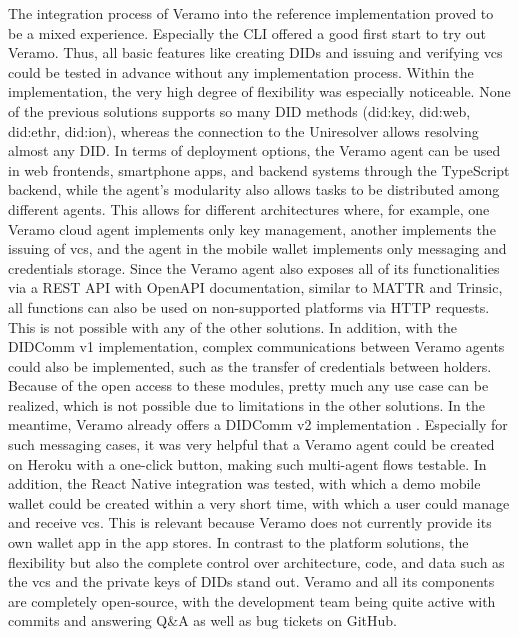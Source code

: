     The integration process of Veramo into the reference implementation proved to be a mixed experience. Especially the CLI offered a good first start to try out Veramo. Thus, all basic features like creating \acp{DID} and issuing and verifying \acp{vc} could be tested in advance without any implementation process. Within the implementation, the very high degree of flexibility was especially noticeable. None of the previous solutions supports so many DID methods (did:key, did:web, did:ethr, did:ion), whereas the connection to the Uniresolver allows resolving almost any DID. In terms of deployment options, the Veramo agent can be used in web frontends, smartphone apps, and backend systems through the TypeScript backend, while the agent's modularity also allows tasks to be distributed among different agents. This allows for different architectures where, for example, one Veramo cloud agent implements only key management, another implements the issuing of \acp{vc}, and the agent in the mobile wallet implements only messaging and credentials storage. Since the Veramo agent also exposes all of its functionalities via a REST API with OpenAPI documentation, similar to MATTR and Trinsic, all functions can also be used on non-supported platforms via HTTP requests. This is not possible with any of the other solutions. In addition, with the DIDComm v1 implementation, complex communications between Veramo agents could also be implemented, such as the transfer of credentials between holders. Because of the open access to these modules, pretty much any use case can be realized, which is not possible due to limitations in the other solutions. In the meantime, Veramo already offers a DIDComm v2 implementation \cite{veramo_blog_2021}. Especially for such messaging cases, it was very helpful that a Veramo agent could be created on Heroku with a one-click button, making such multi-agent flows testable. In addition, the React Native integration was tested, with which a demo mobile wallet could be created within a very short time, with which a user could manage and receive \acp{vc}. This is relevant because Veramo does not currently provide its own wallet app in the app stores. In contrast to the platform solutions, the flexibility but also the complete control over architecture, code, and data such as the \acp{vc} and the private keys of \acp{DID} stand out. Veramo and all its components are completely open-source, with the development team being quite active with commits and answering Q\&A as well as bug tickets on GitHub.  
    
